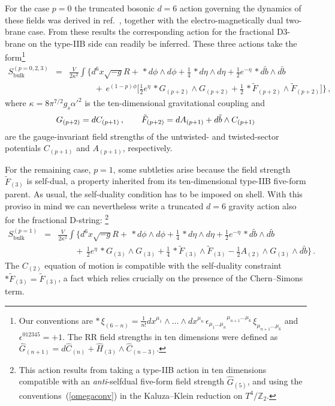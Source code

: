 \documentclass[a4paper,11pt]{article}
\newcommand{\eqref}[1]{(\ref{#1})}
\newcommand{\ZZ}{\mathbb{Z}}  \newcommand{\Zint}{\mathbb{Z}}
\begin{document}
For the case $p=0$ the truncated bosonic $d=6$ action governing the
dynamics of these fields was derived in ref.~\cite{Frau:2000gk},
together with the electro-magnetically dual two-brane case. From these
results the corresponding action for the fractional D3-brane on the
type-IIB side can readily be inferred. These three actions take the
form\footnote{Our conventions are ${*}\,\xi_{(6-n)}=\frac{1}{n!}
dx^{\mu_1}\wedge\ldots\wedge dx^{\mu_n}\,\epsilon_{\mu_1\ldots\mu_n}
{}^{\mu_{n+1}\ldots\mu_{6}}\,\xi_{\mu_{n+1}\ldots\mu_6}$ and
$\epsilon^{012345}=+1$. The RR field strengths in ten dimensions were
defined as
$\hat{G}_{(n+1)}=d\hat{C}_{(n)}+\hat{H}_{(3)}\wedge\hat{C}_{(n-3)}$.}
%
\begin{eqnarray}
\label{thelagrangian}
S_{\mathrm{bulk}}^{(p=0,2,3)} &=& \frac{V}{2\kappa^2}\int \Big\{
 d^6x\sqrt{-g}R + \,{*}d\phi \wedge d\phi +
 \frac{1}{4}\,{*}d\eta\wedge d\eta
 +\frac{1}{2}e^{-\eta}\,{*}d\tilde{b}\wedge d\tilde{b} \nonumber \\ &&
 \qquad\quad
 +\,e^{(1-p)\phi}\Big[\frac{1}{2}e^\eta\,{*}G_{(p+2)}\wedge G_{(p+2)}
 + \frac{1}{2}\,{*}\tilde{F}_{(p+2)}\wedge\tilde{F}_{(p+2)} \Big]
 \Big\} \,,
\end{eqnarray}
where $\kappa = 8 \pi^{7/2} g_s \alpha'^{2}$ is the ten-dimensional
gravitational coupling and
\begin{equation}
\label{GIFstrengths}
G_{(p+2)} = d C_{(p+1)} \,,\qquad \tilde{F}_{(p+2)} = d A_{(p+1)} + d
\tilde{b} \wedge C_{(p+1)}
\end{equation}
are the gauge-invariant field strengths of the untwisted- and
twisted-sector  potentials $C_{(p+1)}$ and $A_{(p+1)}$, respectively.

For the remaining case, $p=1$, some subtleties arise because the field
strength $\tilde{F}_{(3)}$ is self-dual, a property inherited from its
ten-dimensional type-IIB five-form parent. As usual, the self-duality
condition has to be imposed on shell. With this proviso in mind we can
nevertheless write a truncated $d=6$ gravity action also for the
fractional D-string:%
\footnote{This action results from taking a type-IIB action in ten
dimensions compatible with an \emph{anti}-selfdual five-form field
strength $\hat{G}_{(5)}$, and using the conventions~\eqref{omegaconv}
in the Kaluza--Klein reduction on $T^4\!/\ZZ_2$.}
\begin{eqnarray}
\label{action1}
S_{\mathrm{bulk}}^{(p=1)} &=& \frac{V}{2\kappa^2} \int \Big\{
 d^6x\sqrt{-g}R + \,{*}d\phi \wedge d\phi +
 \frac{1}{4}\,{*}d\eta\wedge d\eta
 +\frac{1}{2}e^{-\eta}\,{*}d\tilde{b}\wedge d\tilde{b} \nonumber \\ &&
 \quad\quad +\, \frac{1}{2}e^\eta\,{*}G_{(3)}\wedge G_{(3)} +
 \frac{1}{4}\,{*}\tilde{F}_{(3)}\wedge\tilde{F}_{(3)} - \frac{1}{2}
 A_{(2)} \wedge G_{(3)} \wedge d\tilde{b} \Big\} \,.
\end{eqnarray}
The $C_{(2)}$ equation of motion is compatible with the self-duality
constraint ${*}\tilde{F}_{(3)}=\tilde{F}_{(3)}$, a fact which relies
crucially on the presence of the Chern--Simons term.
\end{document}
